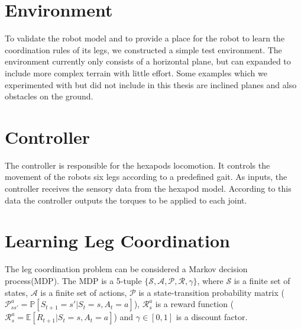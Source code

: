 \section{Environment}
To validate the robot model and to provide a place for the robot to learn the coordination rules of its legs, we constructed a simple test environment.
The environment currently only consists of a horizontal plane, but can expanded to include more complex terrain with little effort.
Some examples which we experimented with but did not include in this thesis are inclined planes and also obstacles on the ground.

\section{Controller}
The controller is responsible for the hexapods locomotion.
It controls the movement of the robots six legs according to a predefined gait.
As inputs, the controller receives the sensory data from the hexapod model.
According to this data the controller outputs the torques to be applied to each joint.


\section{Learning Leg Coordination}
The leg coordination problem can be considered a Markov decision process(MDP).
The MDP is a 5-tuple $\mathcal{\{S,A,P,R,\gamma\}}$, where $\mathcal{S}$ is a finite set of states, $\mathcal{A}$ is a finite set of actions, $\mathcal{P}$ is a state-transition probability matrix ($\mathcal{P}_{ss'}^a=\mathbb{P}[S_{t+1}=s' | S_t=s, A_t=a]$), $\mathcal{R}_s^a$ is a reward function ($\mathcal{R}_s^a = \mathbb{E}[R_{t+1} | S_t=s, A_t=a]$) and $\gamma \in [0,1]$ is a discount factor.


